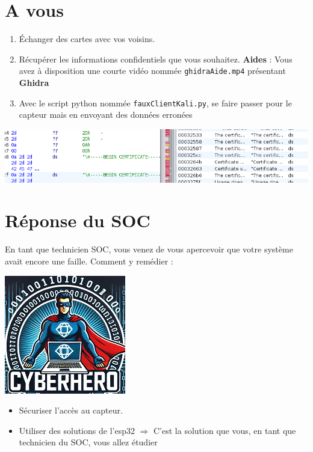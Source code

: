 \documentclass[french, 12pt]{article}%
\newcommand{\itemE}{\item[$\bullet$]}
\begin{document}
\section{A vous}

\begin{enumerate}
\itemE Échanger des cartes avec vos voisins.
\itemE Récupérer les informations confidentiels que vous souhaitez. \textbf{Aides} : Vous avez à disposition une courte vidéo nommée \verb?ghidraAide.mp4? présentant \textbf{Ghidra}
\itemE Avec le script python nommée \verb?fauxClientKali.py?, se faire passer pour le capteur mais en envoyant des données erronées
\end{enumerate}

\begin{center}
\includegraphics[scale=0.7]{./ressource/analyseMem}
\end{center}


\section{Réponse du SOC}

\begin{minipage}{0.55\linewidth}
En tant que technicien SOC, vous venez de vous apercevoir que votre système avait encore une faille. Comment y remédier :  
\end{minipage}
\begin{minipage}{0.44\linewidth}
\begin{center}
\includegraphics[scale=0.7]{./ressource/cyberHro.png}
\end{center}
\end{minipage}

\begin{itemize}
\itemE Sécuriser l'accès au capteur.
\itemE Utiliser des solutions de l'esp32 $\Rightarrow$ C'est la solution que vous, en tant que technicien du SOC, vous allez étudier
\end{itemize}
\end{document}
